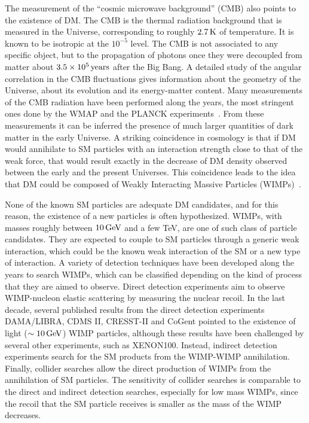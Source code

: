 The measurement of the ``cosmic microwave background'' (CMB) also points to the existence of DM. 
The CMB is the thermal radiation background that is measured in the Universe, corresponding to roughly $\unit[2.7]{K}$ of temperature.
It is known to be isotropic at the $10^{-5}$ level.
The CMB is not associated to any specific object, but to the propagation of photons once they were decoupled from matter about $\unit[3.5 \times 10^5]{years}$ after the Big Bang.
A detailed study of the angular correlation in the CMB fluctuations gives information about the geometry of the Universe, about its evolution and its energy-matter content.
Many measurements of the CMB radiation have been performed along the years, the most stringent ones done by the WMAP and the PLANCK experiments~\cite{Larson:2010gs,Ade:2013zuv}.
From these measurements it can be inferred the presence of much larger quantities of dark matter in the early Universe.
A striking coincidence in cosmology is that if DM would annihilate to SM particles with an interaction strength close to that of the weak force, that would result exactly in the decrease of DM density observed between the early and the present Universes.
This coincidence leads to the idea that DM could be composed of Weakly Interacting Massive Particles (WIMPs)~\cite{Zacek:2007mi}.

None of the known SM particles are adequate DM candidates, and for this reason, the existence of a new particles is often hypothesized.
WIMPs, with masses roughly between $\unit[10]{GeV}$ and a few TeV, are one of such class of particle candidates.
They are expected to couple to SM particles through a generic weak interaction, which could be the known weak interaction of the SM or a new type of interaction.
A variety of detection techniques have been developed along the years to search WIMPs, which can be classified depending on the kind of process that they are aimed to observe.
Direct detection experiments aim to observe WIMP-nucleon elastic scattering by measuring the nuclear recoil.
In the last decade, several published results from the direct detection experiments DAMA/LIBRA\cite{Bernabei:2010mq}, CDMS II\cite{Agnese:2013rvf}, CRESST-II\cite{Angloher:2011uu} and CoGent\cite{Aalseth:2010vx} pointed to the existence of light ($\sim\unit[10]{GeV}$) WIMP particles, although these results have been challenged by several other experiments, such as XENON100\cite{Aprile:2012nq}.
Instead, indirect detection experiments search for the SM products from the WIMP-WIMP annihilation.
Finally, collider searches allow the direct production of WIMPs from the annihilation of SM particles.
The sensitivity of collider searches is comparable to the direct and indirect detection searches, especially for low mass WIMPs, since the recoil that the SM particle receives is smaller as the mass of the WIMP decreases.


